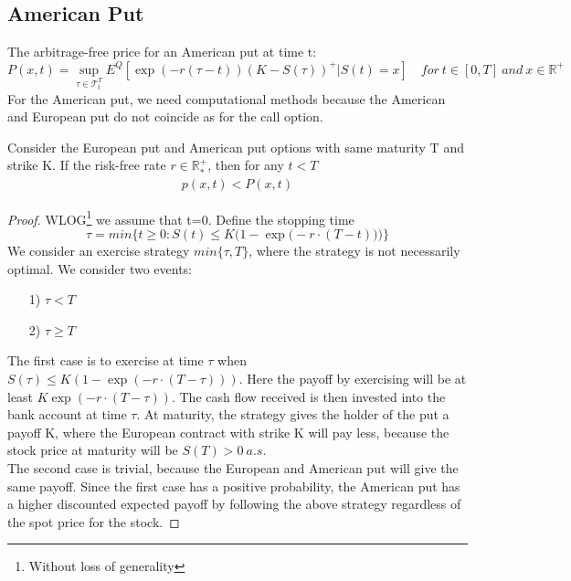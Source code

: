 \subsection{American Put}\label{americanPut}
The arbitrage-free price for an American put at time t:
\begin{equation}\label{AmericanPutPrice}
P(x,t)=\sup_{\tau \in \mathcal{T}_t^T} E^Q[\exp(-r(\tau-t)) (K-S(\tau))^+|S(t)=x] \quad for \ t\in [0,T] \ and \ x\in\mathbb{R}^+
\end{equation}
For the American put, we need computational methods because the American and European put do not coincide as for the call option.

\begin{proposition}{}
Consider the European put and American put options with same maturity T and strike K. If the risk-free rate $r\in \mathbb{R}_*^+$, then for any $t<T$
\begin{equation}
\begin{split}
p(x,t)<P(x,t)
\end{split}
\end{equation}
\begin{proof}
WLOG\footnote{Without loss of generality} we assume that t=0. Define the stopping time
$$\tau = min \{t\geq 0 : S(t) \leq K\bigg(1-\exp\Big(-r\cdot (T-t)\Big)\bigg)\}$$
We consider an exercise strategy $min\{\tau, T\}$, where the strategy is not necessarily optimal. We consider two events:
\begin{enumerate}
\item[1)] $\tau<T$
\item[2)] $\tau \geq T$
\end{enumerate}
The first case is to exercise at time $\tau$ when $S(\tau) \leq K(1-\exp(-r\cdot (T-\tau)))$. Here the payoff by exercising will be at least $K\exp(-r\cdot (T-\tau))$. The cash flow received is then invested into the bank account at time $\tau$. At maturity, the strategy gives the holder of the put a payoff K, where the European contract with strike K will pay less, because the stock price at maturity will be $S(T)>0 \ a.s.$\\

The second case is trivial, because the European and American put will give the same payoff. Since the first case has a positive probability, the American put has a higher discounted expected payoff by following the above strategy regardless of the spot price for the stock. 
\end{proof}
\end{proposition}
